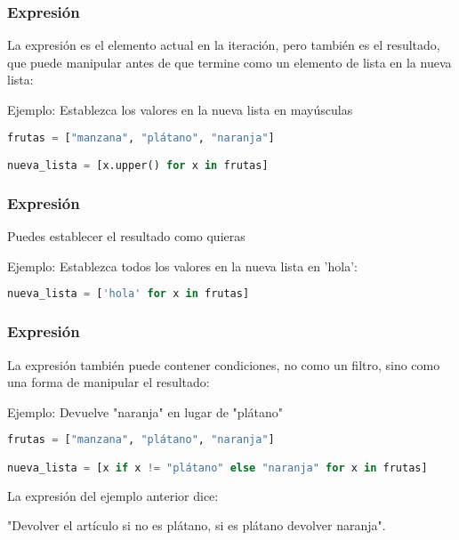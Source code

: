 \begin{frame}[fragile]
  \frametitle{Expresión}

  La expresión es el elemento actual en la iteración,
  pero también es el resultado, que puede manipular antes de que
  termine como un elemento de lista en la nueva lista:

  \vspace{\baselineskip}
  Ejemplo: Establezca los valores en la nueva lista en mayúsculas
  \begin{lstlisting}[language=Python]
frutas = ["manzana", "plátano", "naranja"]

nueva_lista = [x.upper() for x in frutas]
  \end{lstlisting}
\end{frame}

\begin{frame}[fragile]
  \frametitle{Expresión}

  Puedes establecer el resultado como quieras

  \vspace{\baselineskip}
  Ejemplo: Establezca todos los valores en la nueva lista en 'hola':
  \begin{lstlisting}[language=Python]
nueva_lista = ['hola' for x in frutas]
  \end{lstlisting}
\end{frame}

\begin{frame}[fragile]
  \frametitle{Expresión}

  La expresión también puede contener condiciones,
  no como un filtro, sino como una forma de manipular el resultado:

  \vspace{\baselineskip}
  Ejemplo: Devuelve "naranja" en lugar de "plátano"
  \begin{lstlisting}[language=Python]
frutas = ["manzana", "plátano", "naranja"]

nueva_lista = [x if x != "plátano" else "naranja" for x in frutas]
  \end{lstlisting}

  La expresión del ejemplo anterior dice:

  \vspace{\baselineskip}
  "Devolver el artículo si no es plátano, si es plátano devolver naranja".
\end{frame}
